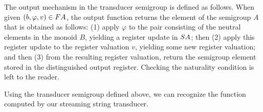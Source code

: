 The output mechanism in the transducer semigroup is defined as follows.  When given $(b,\varphi,v) \in \functor A$, the output function returns the element of the semigroup $A$ that is obtained as follows:  (1) apply  $\varphi$ to the pair consisting of the neutral elements in the monoid $B$, yielding a register update in $\functors A$; then (2) apply this  register update to the register valuation $v$,  yielding some new register valuation; and then (3) from the resulting register valuation, return the semigroup element stored in the distinguished output register.  Checking the naturality condition is left to the reader.

Using the transducer semigroup defined above, we can recognize the function  computed by our streaming string transducer. 
